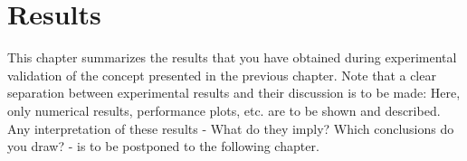 \chapter{Results}
\label{chap:results}

This chapter summarizes the results that you have obtained during experimental validation of the concept presented in the previous chapter.
Note that a clear separation between experimental results and their discussion is to be made: Here, only numerical results, performance plots, etc. are to be shown and described.
Any interpretation of these results - What do they imply? Which conclusions do you draw? - is to be postponed to the following chapter.

